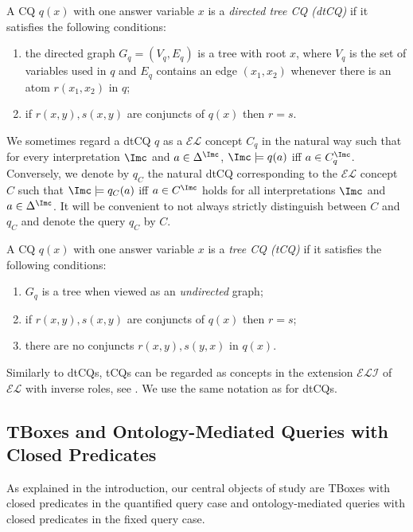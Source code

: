 \documentclass{lmcs}
\theoremstyle{definition}
\begin{document}
A CQ $q(x)$ with one answer variable $x$ is a
\emph{directed tree CQ (dtCQ)} if it satisfies the following
conditions:
%
\begin{enumerate}

\item the directed graph $G_q=(V_q,E_q)$ is a tree with root $x$,
  where $V_q$ is the set of variables used in $q$ and $E_q$ contains an
  edge $(x_1,x_2)$ whenever there is an atom $r(x_1,x_2)$ in $q$;

\item if $r(x,y),s(x,y)$ are conjuncts of $q(x)$ then $r=s$.

\end{enumerate}
%
We sometimes regard a dtCQ $q$ as a $\mathcal{EL}$ concept $C_{q}$ in
the natural way such that for every interpretation $\Imc$ and
$a\in \Delta^{\Imc}$, $\Imc\models q(a)$ iff $a\in C_{q}^{\Imc}$.
Conversely, we denote by $q_{C}$ the natural dtCQ corresponding to the
$\mathcal{EL}$ concept $C$ such that $\Imc\models q_{C}(a)$ iff
$a\in C^{\Imc}$ holds for all interpretations $\Imc$ and
$a\in \Delta^{\Imc}$.  It will be convenient to not always strictly
distinguish between $C$ and $q_{C}$ and denote the query $q_{C}$ by
$C$.

A CQ $q(x)$ with one answer variable $x$ is a \emph{tree CQ (tCQ)} if it
satisfies the following conditions:
%
\begin{enumerate}

\item $G_q$ is a tree when viewed as an \emph{undirected} graph;

\item if $r(x,y),s(x,y)$ are conjuncts of $q(x)$ then $r=s$;

\item there are no conjuncts $r(x,y),s(y,x)$ in $q(x)$.

\end{enumerate}
Similarly to dtCQs, tCQs can be regarded as concepts in the extension
$\mathcal{ELI}$ of $\mathcal{EL}$ with inverse roles, see
\cite{DBLP:books/daglib/0041477}. We use the same notation as for
dtCQs.



\subsection{TBoxes and Ontology-Mediated Queries with Closed Predicates}

As explained in the introduction, our central objects of study are
TBoxes with closed predicates in the quantified query case and 
ontology-mediated queries with closed predicates in the fixed query
case. 
\end{document}
